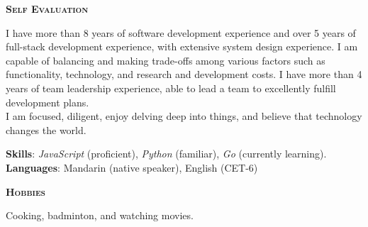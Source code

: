 \documentclass[a4paper]{article}
\newenvironment{changemargin}[2]{%
  \begin{list}{}{%
    \setlength{\topsep}{0pt}%
    \setlength{\leftmargin}{#1}%
    \setlength{\rightmargin}{#2}%
    \setlength{\listparindent}{\parindent}%
    \setlength{\itemindent}{\parindent}%
    \setlength{\parsep}{\parskip}%
  }%
  \item[]}{\end{list}
}
\newcommand{\lineover}{
	\begin{changemargin}{-0.05in}{-0.05in}
		\vspace*{-8pt}
		\hrulefill \\
		\vspace*{-2pt}
	\end{changemargin}
}
\newcommand{\header}[1]{
	\begin{changemargin}{-0.5in}{-0.5in}
		\scshape{\large \textbf{#1}}\\
	\end{changemargin}
}
\newenvironment{body} {
	\vspace*{-16pt}
	\begin{changemargin}{-0.5in}{-0.5in}
  }
	{\end{changemargin}
}
\begin{document}
\medskip


\header{Self Evaluation}

\begin{body}
	\vspace{16pt}
	\begin{justify}
		I have more than 8 years of software development experience and over 5 years of full-stack development experience, with extensive system design experience. I am capable of balancing and making trade-offs among various factors such as functionality, technology, and research and development costs. I have more than 4 years of team leadership experience, able to lead a team to excellently fulfill development plans.\\
		I am focused, diligent, enjoy delving deep into things, and believe that technology changes the world.\\
	\end{justify}
	\vspace{-6pt}
	\textbf{Skills}: \emph{JavaScript} (proficient), \emph{Python} (familiar), \emph{Go} (currently learning). \\
	\textbf{Languages}: Mandarin {(native speaker)}, English {(CET-6)}\\
\end{body}

\medskip

\header{Hobbies}

\begin{body}
	\vspace{16pt}
	Cooking, badminton, and watching movies.\\
\end{body}
\end{document}
